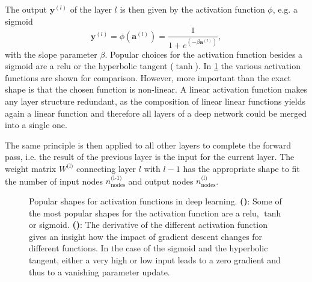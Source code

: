 The output $\mathbf{y}^{(l)}$ of the layer $l$ is then given by the activation function $\phi$, e.g. a sigmoid
\begin{equation*}
\mathbf{y}^{(l)} = \phi(\mathbf{a}^{(l)}) = \frac{1}{1 + e^{(-\beta \mathbf{a}^{(l)})}},
\end{equation*}
with the slope parameter $\beta$. Popular choices for the activation function besides a sigmoid are a \gls{relu} or the hyperbolic tangent ($\tanh$). In \cref{dltransfer} the various activation functions are shown for comparison. However, more important than the exact shape is that the chosen function is non-linear. A linear activation function makes any layer structure redundant, as the composition of linear linear functions yields again a linear function and therefore all layers of a deep network could be merged into a single one.

The same principle is then applied to all other layers to complete the forward pass, i.e. the result of the previous layer is the input for the current layer. The weight matrix $W^{\text{(l)}}$ connecting layer $l$ with $l-1$ has the appropriate shape to fit the number of input nodes $n^{\text{(l-1)}}_\text{nodes}$ and output nodes $n^{\text{(l)}}_\text{nodes}$.

\begin{figure}
	\begin{subfigure}[c]{0.5\textwidth}
		\centering
		\caption{}
		\label{dltransfer}
	\end{subfigure}
	\begin{subfigure}[c]{0.5\textwidth}
		\centering
		\caption{}
		\label{dltransfergradient}
	\end{subfigure}
	\caption[Popular shapes for activation functions in deep learning.]{Popular shapes for activation functions in deep learning. \textbf{()}: Some of the most popular shapes for the activation function are a \gls{relu}, $\tanh$ or sigmoid. \textbf{()}: The derivative of the different activation function gives an insight how the impact of gradient descent changes for different functions. In the case of the sigmoid and the hyperbolic tangent, either a very high or low input leads to a zero gradient and thus to a vanishing parameter update.}
	\label{deeplearning_activation_functions}
\end{figure}

